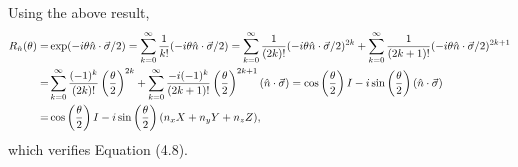 \documentclass[en]{sol-man}
\begin{document}
\begin{pf}
    Using the above result,
    \begin{align}
        \notag R_{\hat{n}}(\theta)=&\exp(-i\theta\hat{n}\cdot\vec{\sigma}/2)=\sum_{k=0}^{\infty}\frac{1}{k!}(-i\theta\hat{n}\cdot\vec{\sigma}/2)=\sum_{k=0}^{\infty}\frac{1}{(2k)!}(-i\theta\hat{n}\cdot\vec{\sigma}/2)^{2k}+\sum_{k=0}^{\infty}\frac{1}{(2k+1)!}(-i\theta\hat{n}\cdot\vec{\sigma}/2)^{2k+1}\\
        \notag=&\sum_{k=0}^{\infty}\frac{(-1)^k}{(2k)!}\left(\frac{\theta}{2}\right)^{2k}+\sum_{k=0}^{\infty}\frac{-i(-1)^k}{(2k+1)!}\left(\frac{\theta}{2}\right)^{2k+1}(\hat{n}\cdot\vec{\sigma})=\cos\left(\frac{\theta}{2}\right)I-i\sin\left(\frac{\theta}{2}\right)(\hat{n}\cdot\vec{\sigma})\\
        =&\cos\left(\frac{\theta}{2}\right)I-i\sin\left(\frac{\theta}{2}\right)(n_xX+n_yY+n_zZ),
    \end{align}
    which verifies Equation (4.8).
\end{pf}
\end{document}
